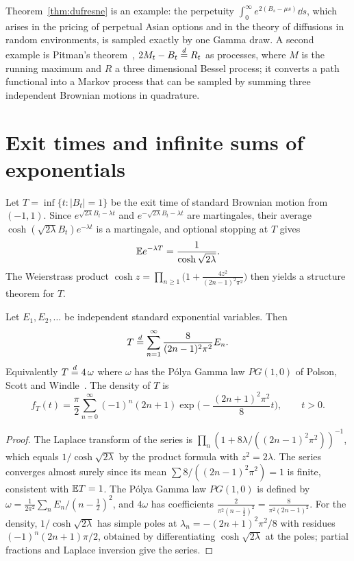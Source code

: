 Theorem~\ref{thm:dufresne} is an example: the perpetuity $\int_0^\infty e^{2(B_s-\mu s)}\dd s$, which arises in the pricing of perpetual Asian options and in the theory of diffusions in random environments, is sampled exactly by one Gamma draw. A second example is Pitman's theorem~\cite{pitman1975}, $2M_t - B_t\stackrel{d}{=} R_t$ as processes, where $M$ is the running maximum and $R$ a three dimensional Bessel process; it converts a path functional into a Markov process that can be sampled by summing three independent Brownian motions in quadrature.



\section{Exit times and infinite sums of exponentials}

Let $T = \inf\{t: |B_t| = 1\}$ be the exit time of standard Brownian motion from $(-1,1)$. Since $e^{\sqrt{2\lambda}B_t - \lambda t}$ and $e^{-\sqrt{2\lambda}B_t-\lambda t}$ are martingales, their average $\cosh(\sqrt{2\lambda}B_t)e^{-\lambda t}$ is a martingale, and optional stopping at $T$ gives
\begin{equation}
\mathbb{E} e^{-\lambda T} = \frac{1}{\cosh\sqrt{2\lambda}}.
\label{eq:exit_laplace}
\end{equation}
The Weierstrass product $\cosh z = \prod_{n\geq1}\big(1 + \frac{4z^2}{(2n-1)^2\pi^2}\big)$ then yields a structure theorem for $T$.

\begin{theorem}
\label{thm:exit_series}
Let $E_1,E_2,\dots$ be independent standard exponential variables. Then
\[
T\stackrel{d}{=}\sum_{n=1}^\infty\frac{8}{(2n-1)^2\pi^2}E_n.
\]
Equivalently $T\stackrel{d}{=} 4\,\omega$ where $\omega$ has the P\'olya Gamma law $PG(1,0)$ of Polson, Scott and Windle~\cite{psw2013}. The density of $T$ is
\[
f_T(t) = \frac{\pi}{2}\sum_{n=0}^\infty(-1)^n(2n+1)\exp\Big(-\frac{(2n+1)^2\pi^2}{8}t\Big),\qquad t>0.
\]
\end{theorem}

\begin{proof}
The Laplace transform of the series is $\prod_n(1+8\lambda/((2n-1)^2\pi^2))^{-1}$, which equals $1/\cosh\sqrt{2\lambda}$ by the product formula with $z^2 = 2\lambda$. The series converges almost surely since its mean $\sum 8/((2n-1)^2\pi^2) = 1$ is finite, consistent with $\mathbb{E} T = 1$. The P\'olya Gamma law $PG(1,0)$ is defined by $\omega = \frac{1}{2\pi^2}\sum_n E_n/(n-\frac12)^2$, and $4\omega$ has coefficients $\frac{2}{\pi^2(n-\frac12)^2} = \frac{8}{\pi^2(2n-1)^2}$. For the density, $1/\cosh\sqrt{2\lambda}$ has simple poles at $\lambda_n = -(2n+1)^2\pi^2/8$ with residues $(-1)^n(2n+1)\pi/2$, obtained by differentiating $\cosh\sqrt{2\lambda}$ at the poles; partial fractions and Laplace inversion give the series.
\end{proof}

